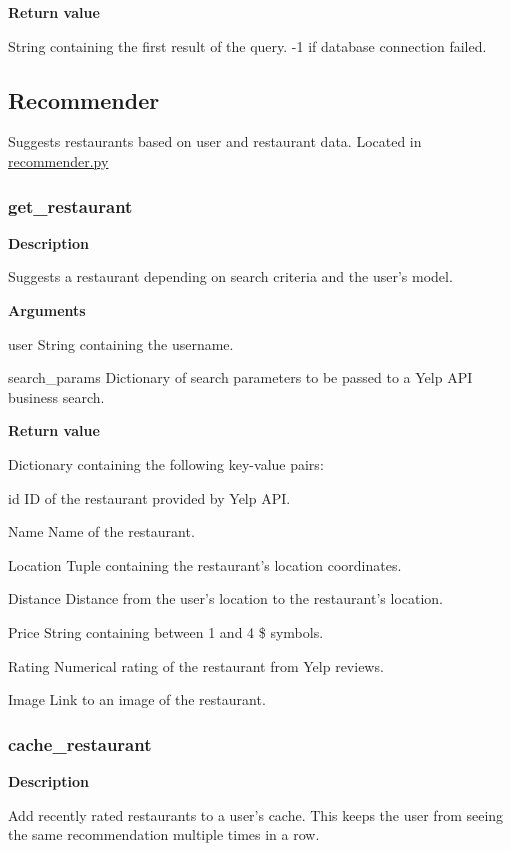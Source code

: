 \documentclass[11pt]{article}
\begin{document}
\textbf{Return value}

String containing the first result of the query. -1 if database connection failed.

\subsection{Recommender}
Suggests restaurants based on user and restaurant data. Located in \url{recommender.py}

\subsubsection{get\_restaurant}
\textbf{Description}

Suggests a restaurant depending on search criteria and the user's model.

\textbf{Arguments}
\begin{deflist}
	\item[user]String containing the username.
	\item[search\_params]Dictionary of search parameters to be passed to a Yelp API business search.
\end{deflist}

\textbf{Return value}

Dictionary containing the following key-value pairs:
\begin{deflist}
	\item[id]ID of the restaurant provided by Yelp API.
	\item[Name]Name of the restaurant.
	\item[Location]Tuple containing the restaurant's location coordinates.
	\item[Distance]Distance from the user's location to the restaurant's location.
	\item[Price]String containing between 1 and 4 \$ symbols.
	\item[Rating]Numerical rating of the restaurant from Yelp reviews.
	\item[Image]Link to an image of the restaurant.
\end{deflist}

\subsubsection{cache\_restaurant}
\textbf{Description}

Add recently rated restaurants to a user's cache. This keeps the user from seeing the same recommendation multiple times in a row.
\end{document}
